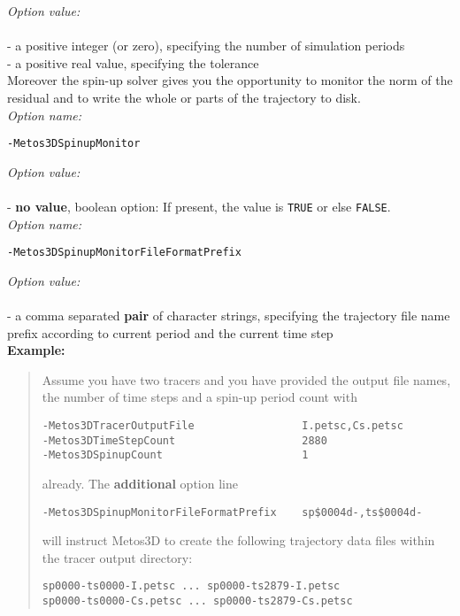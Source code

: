 \documentclass{article}
\begin{document}
\emph{Option value:} \\
\vspace{-0.3cm}\\
- a positive integer (or zero), specifying the number of simulation periods \\
- a positive real value, specifying the tolerance \\

Moreover the spin-up solver gives you the opportunity to monitor the
norm of the residual and to write the whole or parts of the trajectory to disk. \\

\emph{Option name:}
\begin{verbatim}
-Metos3DSpinupMonitor
\end{verbatim}

\emph{Option value:} \\
\vspace{-0.3cm}\\
- \textbf{no value}, boolean option: If present, the value is \texttt{TRUE} or else \texttt{FALSE}. \\

\emph{Option name:}
\begin{verbatim}
-Metos3DSpinupMonitorFileFormatPrefix
\end{verbatim}

\emph{Option value:} \\
\vspace{-0.3cm}\\
- a comma separated \textbf{pair} of character strings, specifying 
the trajectory file name prefix according to current period and
the current time step \\

\textbf{Example:}
\begin{quote}
Assume you have two tracers and you have provided the output file names,
the number of time steps and a spin-up period count with
\begin{verbatim}
-Metos3DTracerOutputFile                 I.petsc,Cs.petsc
-Metos3DTimeStepCount                    2880
-Metos3DSpinupCount                      1
\end{verbatim}
already. The \textbf{additional} option line
\begin{verbatim}
-Metos3DSpinupMonitorFileFormatPrefix    sp$0004d-,ts$0004d-
\end{verbatim}
will instruct Metos3D to create the following trajectory data files
within the tracer output directory:
\begin{verbatim}
sp0000-ts0000-I.petsc ... sp0000-ts2879-I.petsc
sp0000-ts0000-Cs.petsc ... sp0000-ts2879-Cs.petsc
\end{verbatim}
\end{quote}
\end{document}

